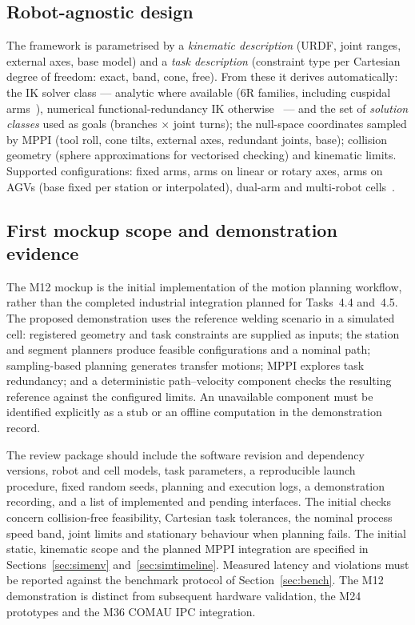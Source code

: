 \documentclass{plan4ari_report}
\begin{document}
\subsection{Robot-agnostic design}\label{sec:agnostic}
The framework is parametrised by a \emph{kinematic description} (URDF, joint ranges, external axes, base model) and a \emph{task description} (constraint type per Cartesian degree of freedom: exact, band, cone, free). From these it derives automatically: the IK solver class --- analytic where available (6R families, including cuspidal arms~\cite{elias2025cuspidal}), numerical functional-redundancy IK otherwise~\cite{razjigaev2025functional} --- and the set of \emph{solution classes} used as goals (branches $\times$ joint turns); the null-space coordinates sampled by MPPI (tool roll, cone tilts, external axes, redundant joints, base); collision geometry (sphere approximations for vectorised checking) and kinematic limits. Supported configurations: fixed arms, arms on linear or rotary axes, arms on AGVs (base fixed per station or interpolated), dual-arm and multi-robot cells~\cite{ye2026nullspacemultirobot}.

\subsection{First mockup scope and demonstration evidence}\label{sec:mockup}
The M12 mockup is the initial implementation of the motion planning workflow, rather than the completed industrial integration planned for Tasks~4.4 and~4.5. The proposed demonstration uses the reference welding scenario in a simulated cell: registered geometry and task constraints are supplied as inputs; the station and segment planners produce feasible configurations and a nominal path; sampling-based planning generates transfer motions; MPPI explores task redundancy; and a deterministic path--velocity component checks the resulting reference against the configured limits. An unavailable component must be identified explicitly as a stub or an offline computation in the demonstration record.

The review package should include the software revision and dependency versions, robot and cell models, task parameters, a reproducible launch procedure, fixed random seeds, planning and execution logs, a demonstration recording, and a list of implemented and pending interfaces. The initial checks concern collision-free feasibility, Cartesian task tolerances, the nominal process speed band, joint limits and stationary behaviour when planning fails. The initial static, kinematic scope and the planned MPPI integration are specified in Sections~\ref{sec:simenv} and~\ref{sec:simtimeline}. Measured latency and violations must be reported against the benchmark protocol of Section~\ref{sec:bench}. The M12 demonstration is distinct from subsequent hardware validation, the M24 prototypes and the M36 COMAU IPC integration.
\end{document}
